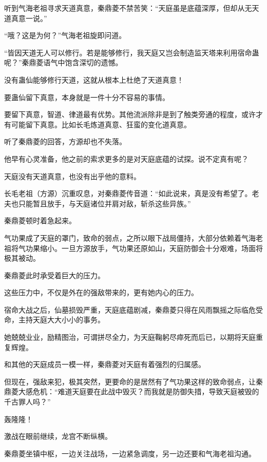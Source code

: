 
\begin{this_body}



听到气海老祖寻求天道真意，秦鼎菱不禁苦笑：“天庭虽是底蕴深厚，但却从无天道真意一说。”

“哦？这是为何？”气海老祖旋即问道。

“皆因天道无人可以修行。若是能够修行，我天庭又岂会制造监天塔来利用宿命蛊呢？”秦鼎菱语气中饱含深切的遗憾。

没有蛊仙能够修行天道，这就从根本上杜绝了天道真意！

要蛊仙留下真意，本身就是一件十分不容易的事情。

要留下真意，智道、律道最有优势。其他流派除非是到了触类旁通的程度，或许才有可能留下真意。比如长毛炼道真意、狂蛮的变化道真意。

听了秦鼎菱的回答，方源却也不失落。

他早有心灵准备，他之前的索求更多的是对天庭底蕴的试探。说不定真有呢？

天庭没有天道真意，也没有出乎他的意料。

长毛老祖（方源）沉重叹息，对秦鼎菱传音道：“如此说来，真是没有希望了。老夫也只能暂且放手，与天庭诸位并肩对敌，斩杀这些异族。”

秦鼎菱顿时着急起来。

气功果成了天庭的罩门，致命的弱点，之所以眼下战局僵持，大部分依赖着气海老祖将气功果缩小。一旦方源放手，气功果还原如山，天庭防御会十分艰难，场面将极其被动。

秦鼎菱此时承受着巨大的压力。

这些压力中，不仅是外在的强敌带来的，更有她内心的压力。

宿命大战之后，仙墓损毁严重，天庭底蕴剧减，秦鼎菱只得在风雨飘摇之际临危受命，主持天庭大大小小的事务。

她兢兢业业，励精图治，可谓拼尽全力，为天庭鞠躬尽瘁死而后已，以期将天庭重复辉煌。

和其他的天庭成员一模一样，秦鼎菱对天庭有着强烈的归属感。

但现在，强敌来犯，极其突然，更要命的是居然有了气功果这样的致命弱点，让秦鼎菱大感危机：“难道天庭要在此战中毁灭？而我就是防御失措，导致天庭被毁的千古罪人吗？”

轰隆隆！

激战在眼前继续，龙宫不断纵横。

秦鼎菱坐镇中枢，一边关注战场，一边紧急调度，另一边还要和气海老祖沟通。


\end{this_body}
